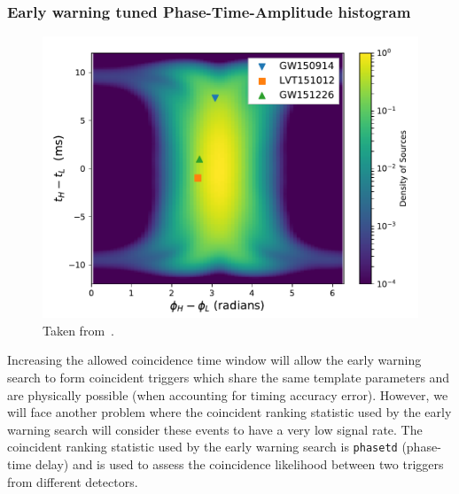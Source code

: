 \subsubsection{\label{6:sec:ew_phasetd}Early warning tuned Phase-Time-Amplitude histogram}
\begin{figure}
    \centering
    \includegraphics[width=1.0\linewidth]{images/6_earlywarning/identified-problems/phase_time.pdf}
    \caption{Taken from~\cite{PyCBC:2017}.}
    \label{6:fig:phase-time-histogram}
\end{figure}
%
Increasing the allowed coincidence time window will allow the early warning search to form coincident triggers which share the same template parameters and are physically possible (when accounting for timing accuracy error). However, we will face another problem where the coincident ranking statistic used by the early warning search will consider these events to have a very low signal rate. The coincident ranking statistic used by the early warning search is \texttt{phasetd} (phase-time delay) and is used to assess the coincidence likelihood between two triggers from different detectors.


